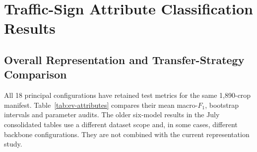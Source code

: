 \clearpage
\section{Traffic-Sign Attribute Classification Results}
\label{sec:ev-attributes}
\subsection{Overall Representation and Transfer-Strategy Comparison}
\label{sec:ev-attribute-overall}
All 18 principal configurations have retained test metrics for the same 1,890-crop manifest. Table~\ref{tab:ev-attributes} compares their mean macro-\(F_1\), bootstrap intervals and parameter audits. The older six-model results in the July consolidated tables use a different dataset scope and, in some cases, different backbone configurations. They are not combined with the current representation study.

